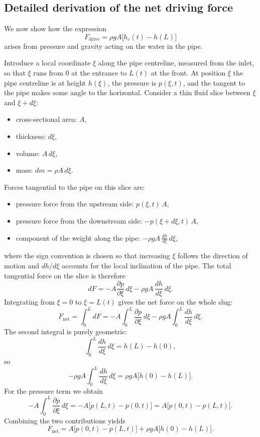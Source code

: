 \documentclass[11pt]{article}
\begin{document}
\subsection{Detailed derivation of the net driving force}

We now show how the expression
\[
  F_{\text{drive}} = \rho g A \bigl[h_c(t) - h(L)\bigr]
\]
arises from pressure and gravity acting on the water in the pipe.

Introduce a local coordinate $\xi$ along the pipe centreline, measured from the inlet, so that
$\xi$ runs from $0$ at the entrance to $L(t)$ at the front. At position $\xi$ the pipe
centreline is at height $h(\xi)$, the pressure is $p(\xi,t)$, and the tangent to the pipe makes
some angle to the horizontal. Consider a thin fluid slice between $\xi$ and $\xi + d\xi$:
\begin{itemize}
  \item cross-sectional area: $A$,
  \item thickness: $d\xi$,
  \item volume: $A\,d\xi$,
  \item mass: $dm = \rho A\,d\xi$.
\end{itemize}
Forces tangential to the pipe on this slice are:
\begin{itemize}
  \item pressure force from the upstream side: $p(\xi,t)\,A$,
  \item pressure force from the downstream side: $-p(\xi + d\xi,t)\,A$,
  \item component of the weight along the pipe: $-\rho g A\,\frac{dh}{d\xi}\,d\xi$,
\end{itemize}
where the sign convention is chosen so that increasing $\xi$ follows the direction of motion
and $dh/d\xi$ accounts for the local inclination of the pipe. The total tangential force on the
slice is therefore
\[
  dF = -A\frac{\partial p}{\partial \xi}\,d\xi - \rho g A\,\frac{dh}{d\xi}\,d\xi.
\]
Integrating from $\xi = 0$ to $\xi = L(t)$ gives the net force on the whole slug:
\[
  F_{\text{net}}
  = \int_0^{L} dF
  = -A\int_0^{L}\frac{\partial p}{\partial \xi}\,d\xi
    - \rho g A \int_0^{L}\frac{dh}{d\xi}\,d\xi.
\]
The second integral is purely geometric:
\[
  \int_0^{L} \frac{dh}{d\xi}\,d\xi = h(L) - h(0),
\]
so
\[
  -\rho g A \int_0^{L} \frac{dh}{d\xi}\,d\xi
  = \rho g A\bigl[h(0) - h(L)\bigr].
\]
For the pressure term we obtain
\[
  -A\int_0^{L}\frac{\partial p}{\partial \xi}\,d\xi
  = -A\bigl[p(L,t) - p(0,t)\bigr]
  = A\bigl[p(0,t) - p(L,t)\bigr].
\]
Combining the two contributions yields
\[
  F_{\text{net}} = A\bigl[p(0,t) - p(L,t)\bigr]
                  + \rho g A\bigl[h(0) - h(L)\bigr].
\]
\end{document}
